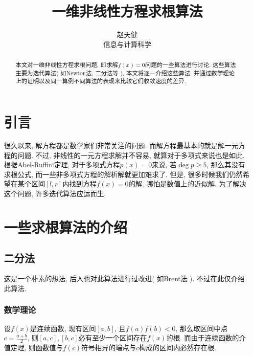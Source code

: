 \documentclass{ctexart}
\title{一维非线性方程求根算法}
\author{赵天健 \\ 信息与计算科学\quad 3210101830}
\begin{document}
\maketitle

\begin{abstract}
本文对一维非线性方程求根问题, 即求解$f(x) = 0$问题的一些算法进行讨论. 这些算法主要为迭代算法( 如Newton法, 二分法等 ), 本文将逐一介绍这些算法, 并通过数学理论上的证明以及同一算例不同算法的表现来比较它们收敛速度的差异. 

\end{abstract}

\section{引言}
很久以来, 解方程都是数学家们非常关注的问题. 而解方程最基本的就是解一元方程的问题. 不过, 非线性的一元方程求解并不容易, 就算对于多项式来说也是如此. 根据Abel-Ruffini定理, 对于多项式方程$p(x) = 0$来说, 若$\deg{p} \ge 5$, 那么其没有求根公式, 而一些非多项式方程的解析解就更加难求了. 但是, 很多时候我们仍然希望在某个区间$[l, r]$内找到方程$f(x) = 0$的解, 哪怕是数值上的近似解. 为了解决这个问题, 许多迭代算法应运而生.

\section{一些求根算法的介绍}
\subsection{二分法}
这是一个朴素的想法, 后人也对此算法进行过改进( 如Brent法 ). 不过在此仅介绍此算法.
\subsubsection{数学理论}
设$f(x)$是连续函数, 现有区间$[a, b]$, 且$f(a)f(b) < 0$, 那么取区间中点$c = \frac{a+b}{2}$, 则$[a, c], [b, c]$必有至少一个区间存在$f(x)$的根. 而由于连续函数的介值定理, 则函数值与$f(c)$符号相异的端点与$c$构成的区间内必然存在根.
\end{document}
